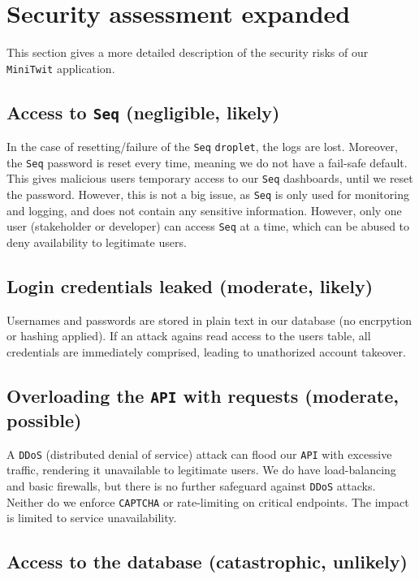 \section{Security assessment expanded}
\label{appn:B}

This section gives a more detailed description of the security risks
of our \texttt{MiniTwit} application.

\subsection{Access to \texttt{Seq} (negligible, likely)}

In the case of resetting/failure of the \texttt{Seq} \texttt{droplet}, the logs 
are lost. Moreover, the \texttt{Seq} password is reset every time, meaning we 
do not have a fail-safe default. This gives malicious users temporary 
access to our \texttt{Seq} dashboards, until we reset the password. However, 
this is not a big issue, as \texttt{Seq} is only used for monitoring and logging, 
and does not contain any sensitive information. However, only one user 
(stakeholder or developer) can access \texttt{Seq} at a time, 
which can be abused to deny availability to legitimate users.

\subsection{Login credentials leaked (moderate, likely)}

Usernames and passwords are stored in plain text in our 
database (no encrpytion or hashing applied). If an attack 
agains read access to the users table, all credentials are 
immediately comprised, leading to unathorized account takeover. 

\subsection{Overloading the \texttt{API} with requests (moderate, possible)}

A \texttt{DDoS} (distributed denial of service) attack can flood our \texttt{API} with 
excessive traffic, rendering it unavailable to legitimate users. 
We do have load-balancing and basic firewalls, but there is no 
further safeguard against \texttt{DDoS} attacks. Neither do we enforce \texttt{CAPTCHA} or 
rate-limiting on critical endpoints. 
The impact is limited to service unavailability. 

\subsection{Access to the database (catastrophic, unlikely)}

